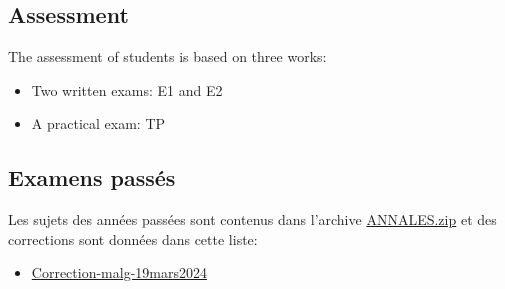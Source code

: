 \documentclass[ 12pt]{article}
\begin{document}
  
  
  
  \subsection{Assessment}
\label{sec:project}

The assessment  of students is based on three works:
\begin{itemize}
\item Two  written  exams: E1 and E2
\item  A practical exam: TP
 \end{itemize}


\subsection{Examens passés}
\label{sec:examens-passes}

Les sujets des années passées sont   contenus dans l'archive
\href{http://mery54.github.io/teaching/movex/lecturesnotes/ANNALES.zip}{ANNALES.zip}
et      des corrections sont données   dans cette liste:

\begin{itemize}
\item  \href{http://mery54.github.io/teaching/movex/lecturesnotes/Correction-malg-19mars2024.pdf}{Correction-malg-19mars2024}
\end{itemize}






 

\end{document}

